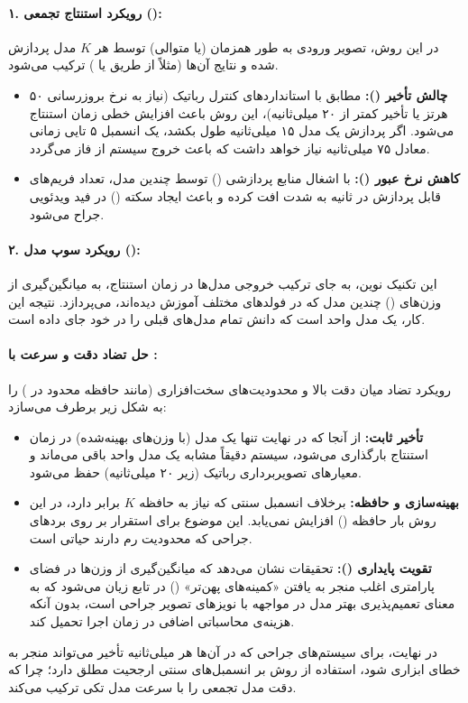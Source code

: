 \documentclass{article}
\begin{document}
\paragraph{۱. رویکرد استنتاج تجمعی ():}
در این روش، تصویر ورودی به طور همزمان (یا متوالی) توسط هر $K$ مدل پردازش شده و نتایج آن‌ها (مثلاً از طریق  یا ) ترکیب می‌شود. 
\begin{itemize}
	\item \textbf{چالش تأخیر ():} مطابق با استانداردهای کنترل رباتیک (نیاز به نرخ بروزرسانی ۵۰ هرتز یا تأخیر کمتر از ۲۰ میلی‌ثانیه)، این روش باعث افزایش خطی زمان استنتاج می‌شود. اگر پردازش یک مدل ۱۵ میلی‌ثانیه طول بکشد، یک انسمبل ۵ تایی زمانی معادل ۷۵ میلی‌ثانیه نیاز خواهد داشت که باعث خروج سیستم از فاز  می‌گردد.
	\item \textbf{کاهش نرخ عبور ():} با اشغال منابع پردازشی () توسط چندین مدل، تعداد فریم‌های قابل پردازش در ثانیه به شدت افت کرده و باعث ایجاد سکته () در فید ویدئویی جراح می‌شود.
\end{itemize}

\paragraph{۲. رویکرد سوپ مدل ():}
این تکنیک نوین، به جای ترکیب خروجی مدل‌ها در زمان استنتاج، به میانگین‌گیری از وزن‌های () چندین مدل که در فولدهای مختلف آموزش دیده‌اند، می‌پردازد. نتیجه این کار، یک مدل واحد است که دانش تمام مدل‌های قبلی را در خود جای داده است.

\paragraph{حل تضاد دقت و سرعت با :}
رویکرد  تضاد میان دقت بالا و محدودیت‌های سخت‌افزاری (مانند حافظه محدود در ) را به شکل زیر برطرف می‌سازد:
\begin{itemize}
	\item \textbf{تأخیر ثابت:} از آنجا که در نهایت تنها یک مدل (با وزن‌های بهینه‌شده) در زمان استنتاج بارگذاری می‌شود،  سیستم دقیقاً مشابه یک مدل واحد باقی می‌ماند و معیارهای تصویربرداری رباتیک (زیر ۲۰ میلی‌ثانیه) حفظ می‌شود.
	\item \textbf{بهینه‌سازی  و حافظه:} برخلاف انسمبل سنتی که نیاز به حافظه $K$ برابر دارد، در این روش بار حافظه () افزایش نمی‌یابد. این موضوع برای استقرار بر روی بردهای جراحی که محدودیت رم دارند حیاتی است.
	\item \textbf{تقویت پایداری ():} تحقیقات نشان می‌دهد که میانگین‌گیری از وزن‌ها در فضای پارامتری اغلب منجر به یافتن «کمینه‌های پهن‌تر» () در تابع زیان می‌شود که به معنای تعمیم‌پذیری بهتر مدل در مواجهه با نویزهای تصویر جراحی است، بدون آنکه هزینه‌ی محاسباتی اضافی در زمان اجرا تحمیل کند.
\end{itemize}

در نهایت، برای سیستم‌های جراحی که در آن‌ها هر میلی‌ثانیه تأخیر می‌تواند منجر به خطای ابزاری شود، استفاده از روش  بر انسمبل‌های سنتی ارجحیت مطلق دارد؛ چرا که دقت مدل تجمعی را با سرعت مدل تکی ترکیب می‌کند.
\end{document}
